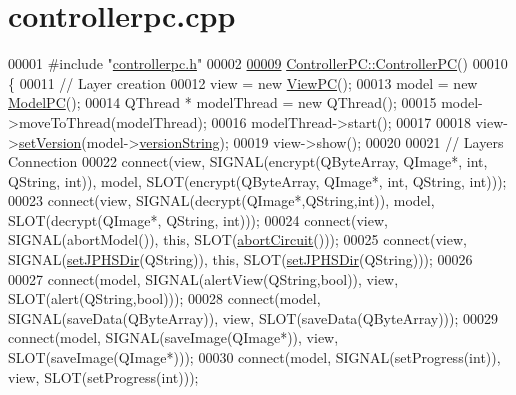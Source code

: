 \hypertarget{controllerpc_8cpp_source}{}\section{controllerpc.\+cpp}
\label{controllerpc_8cpp_source}

\begin{DoxyCode}
00001 \textcolor{preprocessor}{#include "\hyperlink{controllerpc_8h}{controllerpc.h}"}
00002 
\hypertarget{controllerpc_8cpp_source.tex_l00009}{}\hyperlink{class_controller_p_c_afa6c92d67bf3b6531c42385fc5938003}{00009} \hyperlink{class_controller_p_c_afa6c92d67bf3b6531c42385fc5938003}{ControllerPC::ControllerPC}()
00010 \{
00011     \textcolor{comment}{// Layer creation}
00012     view = \textcolor{keyword}{new} \hyperlink{class_view_p_c}{ViewPC}();
00013     model = \textcolor{keyword}{new} \hyperlink{class_model_p_c}{ModelPC}();
00014     QThread * modelThread = \textcolor{keyword}{new} QThread();
00015     model->moveToThread(modelThread);
00016     modelThread->start();
00017 
00018     view->\hyperlink{class_view_p_c_ac05220df875b7c4f24405a5742476ebf}{setVersion}(model->\hyperlink{class_model_p_c_a5f426725ccf7eefd3c77ea8c720264c9}{versionString});
00019     view->show();
00020 
00021     \textcolor{comment}{// Layers Connection}
00022     connect(view, SIGNAL(encrypt(QByteArray, QImage*, \textcolor{keywordtype}{int}, QString, \textcolor{keywordtype}{int})), model, SLOT(encrypt(QByteArray, 
      QImage*, \textcolor{keywordtype}{int}, QString, \textcolor{keywordtype}{int})));
00023     connect(view, SIGNAL(decrypt(QImage*,QString,\textcolor{keywordtype}{int})), model, SLOT(decrypt(QImage*, QString, \textcolor{keywordtype}{int})));
00024     connect(view, SIGNAL(abortModel()), \textcolor{keyword}{this}, SLOT(\hyperlink{class_controller_p_c_a8814989f7be1214e06b2e720889066b0}{abortCircuit}()));
00025     connect(view, SIGNAL(\hyperlink{class_controller_p_c_ac00d29685a7e5b780c01eb438e10f96d}{setJPHSDir}(QString)), \textcolor{keyword}{this}, SLOT(\hyperlink{class_controller_p_c_ac00d29685a7e5b780c01eb438e10f96d}{setJPHSDir}(QString)));
00026 
00027     connect(model, SIGNAL(alertView(QString,\textcolor{keywordtype}{bool})), view, SLOT(alert(QString,\textcolor{keywordtype}{bool})));
00028     connect(model, SIGNAL(saveData(QByteArray)), view, SLOT(saveData(QByteArray)));
00029     connect(model, SIGNAL(saveImage(QImage*)), view, SLOT(saveImage(QImage*)));
00030     connect(model, SIGNAL(setProgress(\textcolor{keywordtype}{int})), view, SLOT(setProgress(\textcolor{keywordtype}{int})));

\end{DoxyCode}
